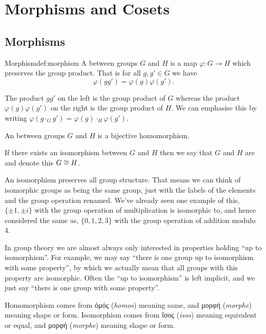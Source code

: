 \chapter{Morphisms and Cosets}
\section{Morphisms}
\begin{dfn}{Morphism}{def:morphism}
    A  between groups \(G\) and \(H\) is a map \(\varphi\colon G \to H\) which preserves the group product.
    That is for all \(g, g' \in G\) we have
    \begin{equation}
        \varphi(gg') = \varphi(g)\varphi(g').
    \end{equation}
    \begin{rmk}
        The product \(gg'\) on the left is the group product of \(G\) whereas the product \(\varphi(g)\varphi(g')\) on the right is the group product of \(H\).
        We can emphasise this by writing \(\varphi(g \cdot_G g') = \varphi(g) \cdot_H \varphi(g')\).
    \end{rmk}
    
    An  between groups \(G\) and \(H\) is a bijective homomorphism.
    
    If there exists an isomorphism between \(G\) and \(H\) then we say that \(G\) and \(H\) are  and denote this \(G \cong H\).
\end{dfn}

An isomorphism preserves all group structure.
That means we can think of isomorphic groups as being the same group, just with the labels of the elements and the group operation renamed.
We've already seen one example of this, \(\{\pm 1, \pm i\}\) with the group operation of multiplication is isomorphic to, and hence considered the same as, \(\{0, 1, 2, 3\}\) with the group operation of addition modulo 4.

In group theory we are almost always only interested in properties holding \enquote{up to isomorphism}.
For example, we may say \enquote{there is one group up to isomorphism with some property}, by which we actually mean that all groups with this property are isomorphic.
Often the \enquote{up to isomorphism} is left implicit, and we just say \enquote{there is one group with some property}.

Homomorphism comes from \textgreek{ὁμός} (\textit{homos}) meaning same, and \textgreek{μορφή} (\textit{morphe}) meaning shape or form.
Isomorphism comes from \textgreek{ἴσος} (\textit{isos}) meaning equivalent or equal, and \textgreek{μορφή} (\textit{morphe}) meaning shape or form.

